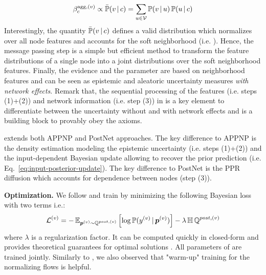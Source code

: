 \begin{equation}\label{eq:agg-evidence-density}
    \beta_c^{\text{agg}, (v)} \propto \bar{\operatorname{\mathbb{P}}}(v \,|\, c) = \sum_{u \in \mathcal{V}} \operatorname{\mathbb{P}}(v \,|\, u) \operatorname{\mathbb{P}}(u \,|\, c)
\end{equation}
Interestingly, the quantity $\bar{\operatorname{\mathbb{P}}}(v \,|\, c)$ defines a valid distribution which normalizes over all node features and accounts for the soft neighborhood (i.e. ). Hence, the message passing step is a simple but efficient method to transform the feature distributions of a single node into a joint distributions over the soft neighborhood features. Finally, the evidence  and the parameter  are based on neighborhood features and can be seen as epistemic and aleatoric uncertainty measures \emph{with network effects}. Remark that, the sequential processing of the features (i.e. steps (1)+(2)) and network information (i.e. step (3)) in \GPNacro{} is a key element to differentiate between the uncertainty without and with network effects and is a building block to provably obey the axioms.

\GPNacro{} extends both APPNP \cite{Klicpera2018} and PostNet \cite{charpentier2020} approaches. The key difference to APPNP is the density estimation modeling the epistemic uncertainty (i.e. steps (1)+(2)) and the input-dependent Bayesian update allowing to recover the prior prediction (i.e. Eq.~\ref{eq:input-posterior-update}). The key difference to PostNet is the PPR diffusion which accounts for dependence between nodes (step (3)).

\textbf{Optimization.} We follow \cite{charpentier2020} and train \GPNacro{} by minimizing the following Bayesian loss with two terms i.e.:
\begin{equation}
    \operatorname{\mathcal{L}}^{(v)} = -\operatorname{\mathbb{E}}_{\bm{p}^{(v)}\sim \operatorname{\mathbb{Q}}^{post, (v)}}\left[\log \operatorname{\mathbb{P}}(y^{(v)} \,|\, \bm{p}^{(v)})\right] - \lambda \operatorname{\mathbb{H}}{\operatorname{\mathbb{Q}}^{post, (v)}}
\end{equation}
where $\lambda$ is a regularization factor. It can be computed quickly in closed-form and provides theoretical guarantees for optimal solutions \cite{charpentier2020}. All parameters of \GPNacro{} are trained jointly. Similarly to \cite{NatPN2021}, we also observed that "warm-up" training for the normalizing flows is helpful. 